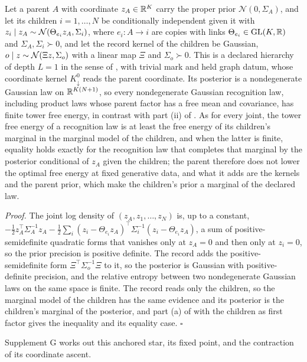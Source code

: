 Let a parent $A$ with coordinate $z_A\in\mathbb R^K$ carry the proper prior $\mathcal N(0,\Sigma_A)$,
and let its children $i=1,\ldots,N$ be conditionally independent given it with
$z_i\mid z_A\sim\mathcal N(\Theta_{e_i}z_A,\Sigma_i)$, where $e_i:A\to i$ are copies with links
$\Theta_{e_i}\in\mathrm{GL}(K,\mathbb R)$ and $\Sigma_A,\Sigma_i\succ0$, and let the record kernel of the
children be Gaussian, $o\mid z\sim\mathcal N(\Xi z,\Sigma_o)$ with a linear map $\Xi$ and
$\Sigma_o\succ0$. This is a declared hierarchy of depth $L=1$ in the sense of
, with trivial mark and held graph datum, whose coordinate
kernel $K^0_\downarrow$ reads the parent coordinate. Its posterior is a nondegenerate Gaussian
law on $\mathbb R^{K(N+1)}$, so every nondegenerate Gaussian recognition law, including product laws
whose parent factor has a free mean and covariance, has finite tower free energy, in contrast
with part (ii) of . As for every joint, the tower free
energy of a recognition law is at least the free energy of its children's marginal in the
marginal model of the children, and when the latter is finite, equality holds exactly for the
recognition law that completes that marginal by the posterior conditional of $z_A$ given the
children; the parent therefore does not
lower the optimal free energy at fixed generative data, and what it adds are the kernels and the
parent prior, which make the children's prior a marginal of the declared law.

\noindent\emph{Proof.}
The joint log density of $(z_A,z_1,\ldots,z_N)$ is, up to a constant,
$-\tfrac12z_A^\top\Sigma_A^{-1}z_A-\tfrac12\sum_i(z_i-\Theta_{e_i}z_A)^\top\Sigma_i^{-1}(z_i-\Theta_{e_i}z_A)$,
a sum of positive-semidefinite quadratic forms that vanishes only at $z_A=0$ and then only at
$z_i=0$, so the prior precision is positive definite. The record adds the positive-semidefinite
form $\Xi^\top\Sigma_o^{-1}\Xi$ to it, so the posterior is Gaussian with positive-definite
precision, and the relative entropy between two nondegenerate Gaussian laws on the same space is
finite. The record reads only the children, so the marginal model of the children has the same
evidence and its posterior is the children's marginal of the posterior, and part (a) of
 with the children as first factor gives the inequality and its
equality case. $\square$

Supplement G works out this anchored star, its fixed point, and the contraction of its
coordinate ascent.

